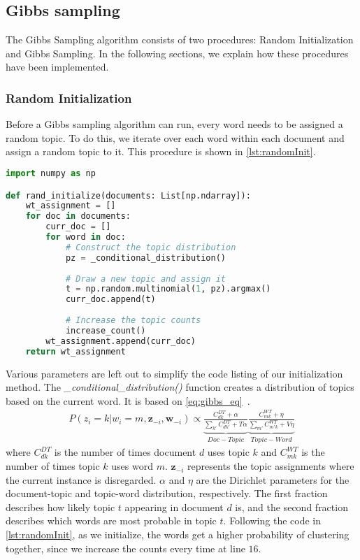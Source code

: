 \subsection{Gibbs sampling}\label{sec:appendix_gibbs}
The Gibbs Sampling algorithm consists of two procedures: Random Initialization and Gibbs Sampling.
In the following sections, we explain how these procedures have been implemented.

\subsubsection{Random Initialization}
Before a Gibbs sampling algorithm can run, every word needs to be assigned a random topic.
To do this, we iterate over each word within each document and assign a random topic to it.
This procedure is shown in \autoref{lst:randomInit}.
\begin{lstlisting}[language=Python, caption=Random Initialization,label={lst:randomInit}, float, floatplacement=H]
import numpy as np

def rand_initialize(documents: List[np.ndarray]):
	wt_assignment = []
	for doc in documents:
		curr_doc = []
		for word in doc:
			# Construct the topic distribution
			pz = _conditional_distribution()
			
			# Draw a new topic and assign it
			t = np.random.multinomial(1, pz).argmax()
			curr_doc.append(t)
			
			# Increase the topic counts
			increase_count()
		wt_assignment.append(curr_doc)
	return wt_assignment
\end{lstlisting}

Various parameters are left out to simplify the code listing of our initialization method.
The \emph{\_conditional\_distribution()} function creates a distribution of topics based on the current word.
It is based on \autoref{eq:gibbs_eq}~\cite{author_topic_2012}.
\begin{equation}\label{eq:gibbs_eq}
	\begin{split}
		P(z_i = k|w_i = m, \boldsymbol{z}_{-i}, \boldsymbol{w}_{-i}) \propto 
		\underbrace{\frac{C^{DT}_{dk} + \alpha}{\sum_{k'} C^{DT}_{dk'} + T\alpha}}_{Doc-Topic}
		\underbrace{\frac{C^{WT}_{mk} + \eta}{\sum_{m'} C^{WT}_{m'k} + V\eta}}_{Topic-Word}
	\end{split}
\end{equation}
where $C^{DT}_{dk}$ is the number of times document $d$ uses topic $k$ and $C^{WT}_{mk}$ is the number of times topic $k$ uses word $m$.
$\boldsymbol{z}_{-i}$ represents the topic assignments where the current instance is disregarded.
$\alpha$ and $\eta$ are the Dirichlet parameters for the document-topic and topic-word distribution, respectively.
The first fraction describes how likely topic $t$ appearing in document $d$ is, and the second fraction describes which words are most probable in topic $t$.
Following the code in \autoref{lst:randomInit}, as we initialize, the words get a higher probability of clustering together, since we increase the counts every time at line $16$.

